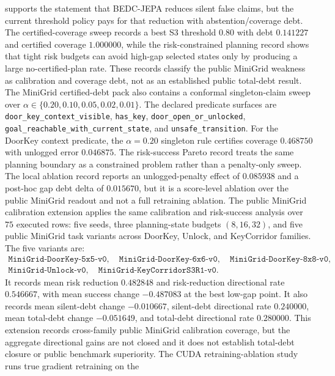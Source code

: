 supports the statement that BEDC-JEPA reduces silent false claims, but the
current threshold policy pays for that reduction with abstention/coverage
debt.  The certified-coverage sweep records a best S3 threshold $0.80$ with
debt $0.141227$ and certified coverage $1.000000$, while the
risk-constrained planning record shows that tight risk budgets can avoid
high-gap selected states only by producing a large no-certified-plan rate.
These records classify the public MiniGrid weakness as calibration and
coverage debt, not as an established public total-debt result.
The MiniGrid certified-debt pack also contains a conformal singleton-claim sweep
over $\alpha \in \{0.20,0.10,0.05,0.02,0.01\}$.  The declared predicate
surfaces are \texttt{door\_key\_context\_visible}, \texttt{has\_key},
\texttt{door\_open\_or\_unlocked},
\texttt{goal\_reachable\_with\_current\_state}, and
\texttt{unsafe\_transition}.  For the DoorKey context predicate, the
$\alpha=0.20$ singleton rule certifies coverage $0.468750$ with unlogged error
$0.046875$.  The risk-success Pareto record treats the same planning
boundary as a constrained problem rather than a penalty-only sweep.  The local
ablation record reports an unlogged-penalty effect of $0.085938$ and a
post-hoc gap debt delta of $0.015670$, but it is a score-level ablation over
the public MiniGrid readout and not a full retraining ablation.  The public
MiniGrid calibration extension applies the same calibration and risk-success
analysis over $75$ executed rows: five seeds, three planning-state budgets
$(8,16,32)$, and five public MiniGrid task variants across DoorKey, Unlock,
and KeyCorridor families.  The five variants are:
$$
\begin{gathered}
\texttt{MiniGrid-DoorKey-5x5-v0},\quad
\texttt{MiniGrid-DoorKey-6x6-v0},\quad
\texttt{MiniGrid-DoorKey-8x8-v0},\\
\texttt{MiniGrid-Unlock-v0},\quad
\texttt{MiniGrid-KeyCorridorS3R1-v0}.
\end{gathered}
$$
It records mean risk reduction $0.482848$
and risk-reduction directional rate $0.546667$, with mean success change $-0.487083$
at the best low-gap point.  It also records mean silent-debt change
$-0.010667$, silent-debt directional rate $0.240000$, mean total-debt change
$-0.051649$, and total-debt directional rate $0.280000$.  This extension records cross-family
public MiniGrid calibration coverage, but the aggregate directional gains are
not closed and it does not establish total-debt closure or public benchmark
superiority.  The CUDA
retraining-ablation study runs true gradient retraining on the
